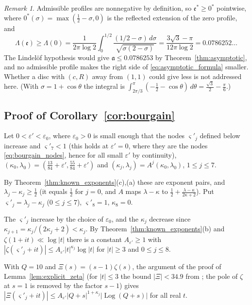\documentclass[11pt,a4paper]{article}
\makeatletter
\numberwithin{equation}{section}
\DeclareRobustCommand{\CGref}[1]{\ref{#1}}
\DeclareRobustCommand{\CGeqref}[1]{\eqref{#1}}
\DeclareRobustCommand{\CGcite}[2][]{\if\relax\detokenize{#1}\relax\cite{#2}\else\cite[#1]{#2}\fi}
\let\CG@origref\ref
\let\CG@origeqref\eqref
\newcommand{\CG@gettip}[1]{\@ifundefined{CGTip@#1}{#1}{\csname CGTip@#1\endcsname}}
\newcommand{\CG@getbib}[1]{\@ifundefined{CGBib@#1}{#1}{\csname CGBib@#1\endcsname}}
\DeclareRobustCommand{\CGref}[1]{\pdftooltip{\CG@origref{#1}}{\CG@gettip{#1}}}
\DeclareRobustCommand{\CGeqref}[1]{\pdftooltip{\CG@origeqref{#1}}{\CG@gettip{#1}}}
\DeclareRobustCommand{\CGcite}[2][]{\pdftooltip{\if\relax\detokenize{#1}\relax\cite{#2}\else\cite[#1]{#2}\fi}{\CG@getbib{#2}}}
\theoremstyle{definition}
\theoremstyle{remark}
\newtheorem{remark}[theorem]{Remark}
\makeatother
\begin{document}
\begin{remark}\label{rem:lindelof}
Admissible profiles are nonnegative by definition, so $\mathfrak e^*\ge0^*$ pointwise, where $0^*(\sigma)=\max(\frac12-\sigma,0)$ is the reflected extension of the zero profile, and
\begin{equation}
\Lambda(\mathfrak e)\ge\Lambda(0)=\frac1{2\pi\log2}\int_0^{1/2}\frac{(1/2-\sigma)\,d\sigma}{\sqrt{\sigma(2-\sigma)}}=\frac{3\sqrt3-\pi}{12\pi\log2}=0.0786252\ldots
\label{eq:disp_17}
\end{equation}
The Lindel\"of hypothesis would give $\mathfrak a\le0.0786253$ by Theorem~\CGref{thm:asymptotic}, and no admissible profile makes the right side of \CGeqref{eq:asymptotic_formula} smaller. Whether a disc with $(c,R)$ away from $(1,1)$ could give less is not addressed here.
(With $\sigma=1+\cos\theta$ the integral is $\int_{2\pi/3}^\pi(-\frac12-\cos\theta)\,d\theta=\frac{\sqrt3}2-\frac\pi6$.)
\end{remark}

\subsection{Proof of Corollary~\ref{cor:bourgain}}\label{subsec:proof_bourgain}
Let $0<\varepsilon'<\varepsilon_0$, where $\varepsilon_0>0$ is small enough that the nodes $\varsigma'_j$ defined below increase and $\varsigma'_7<1$ (this holds at $\varepsilon'=0$, where they are the nodes \CGeqref{eq:bourgain_nodes}, hence for all small $\varepsilon'$ by continuity), $(\kappa_0,\lambda_0)=(\frac{13}{84}+\varepsilon',\frac{55}{84}+\varepsilon')$ and $(\kappa_j,\lambda_j)=A^j(\kappa_0,\lambda_0)$, $1\le j\le7$.

By Theorem~\CGref{thm:known_exponents}(c),(a) these are exponent pairs, and $\lambda_j-\kappa_j\ge\frac12$ (it equals $\frac12$ for $j=0$, and $A$ maps $\lambda-\kappa$ to $\frac12+\frac{\lambda-\kappa}{2\kappa+2}$). Put $\varsigma'_j=\lambda_j-\kappa_j$ ($0\le j\le7$), $\varsigma'_8=1$, $\kappa_8=0$.

The $\varsigma'_j$ increase by the choice of $\varepsilon_0$, and the $\kappa_j$ decrease since $\kappa_{j+1}=\kappa_j/(2\kappa_j+2)<\kappa_j$. By Theorem~\CGref{thm:known_exponents}(b) and $\zeta(1+it)\ll\log|t|$ there is a constant $A_{\varepsilon'}\ge1$ with $|\zeta(\varsigma'_j+it)|\le A_{\varepsilon'}|t|^{\kappa_j}\log|t|$ for $|t|\ge3$ and $0\le j\le8$.

With $Q=10$ and $\Xi(s)=(s-1)\zeta(s)$, the argument of the proof of Lemma~\CGref{lem:explicit_zeta} (for $|t|\le3$ the bound $|\Xi|<34.9$ from \CGcite[(2.1.4)]{Titchmarsh1986}; the pole of $\zeta$ at $s=1$ is removed by the factor $s-1$) gives $|\Xi(\varsigma'_j+it)|\le A_{\varepsilon'}|Q+s|^{1+\kappa_j}|\operatorname{Log}(Q+s)|$ for all real $t$.
\end{document}
